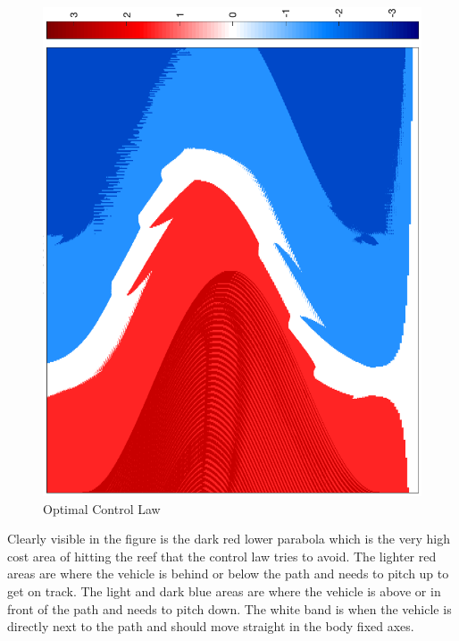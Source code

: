 \begin{figure}[h]
    \centerline{\includegraphics[width=0.5\linewidth]{img/U_star.png}}
    \caption{Optimal Control Law}
    \label{fig:Ustar}
\end{figure}

Clearly visible in the figure is the dark red lower parabola which is the very high cost area of hitting the reef that the control law tries to avoid. The lighter red areas are where the vehicle is behind or below the path and needs to pitch up to get on track. The light and dark blue areas are where the vehicle is above or in front of the path and needs to pitch down. The white band is when the vehicle is directly next to the path and should move straight in the body fixed axes.











